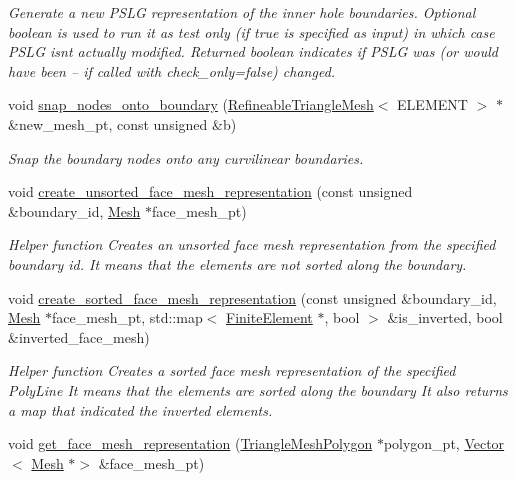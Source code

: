 \begin{DoxyCompactItemize}
\begin{DoxyCompactList}\small\item\em Generate a new P\+S\+LG representation of the inner hole boundaries. Optional boolean is used to run it as test only (if true is specified as input) in which case P\+S\+LG isn\textquotesingle{}t actually modified. Returned boolean indicates if P\+S\+LG was (or would have been -- if called with check\+\_\+only=false) changed. \end{DoxyCompactList}\item 
void \hyperlink{classoomph_1_1RefineableTriangleMesh_a3c302af1c17063eb32f56abe9f000360}{snap\+\_\+nodes\+\_\+onto\+\_\+boundary} (\hyperlink{classoomph_1_1RefineableTriangleMesh}{Refineable\+Triangle\+Mesh}$<$ E\+L\+E\+M\+E\+NT $>$ $\ast$\&new\+\_\+mesh\+\_\+pt, const unsigned \&b)
\begin{DoxyCompactList}\small\item\em Snap the boundary nodes onto any curvilinear boundaries. \end{DoxyCompactList}\item 
void \hyperlink{classoomph_1_1RefineableTriangleMesh_ab1268ab0f9ea49ef262e51a0e90136b5}{create\+\_\+unsorted\+\_\+face\+\_\+mesh\+\_\+representation} (const unsigned \&boundary\+\_\+id, \hyperlink{classoomph_1_1Mesh}{Mesh} $\ast$face\+\_\+mesh\+\_\+pt)
\begin{DoxyCompactList}\small\item\em Helper function Creates an unsorted face mesh representation from the specified boundary id. It means that the elements are not sorted along the boundary. \end{DoxyCompactList}\item 
void \hyperlink{classoomph_1_1RefineableTriangleMesh_a8ad12ebe7625ff189c1f7beb1eabff04}{create\+\_\+sorted\+\_\+face\+\_\+mesh\+\_\+representation} (const unsigned \&boundary\+\_\+id, \hyperlink{classoomph_1_1Mesh}{Mesh} $\ast$face\+\_\+mesh\+\_\+pt, std\+::map$<$ \hyperlink{classoomph_1_1FiniteElement}{Finite\+Element} $\ast$, bool $>$ \&is\+\_\+inverted, bool \&inverted\+\_\+face\+\_\+mesh)
\begin{DoxyCompactList}\small\item\em Helper function Creates a sorted face mesh representation of the specified Poly\+Line It means that the elements are sorted along the boundary It also returns a map that indicated the inverted elements. \end{DoxyCompactList}\item 
void \hyperlink{classoomph_1_1RefineableTriangleMesh_a5ebb485316134f608bc89ab9854eac6c}{get\+\_\+face\+\_\+mesh\+\_\+representation} (\hyperlink{classoomph_1_1TriangleMeshPolygon}{Triangle\+Mesh\+Polygon} $\ast$polygon\+\_\+pt, \hyperlink{classoomph_1_1Vector}{Vector}$<$ \hyperlink{classoomph_1_1Mesh}{Mesh} $\ast$$>$ \&face\+\_\+mesh\+\_\+pt)
$$
\end{DoxyCompactItemize}
